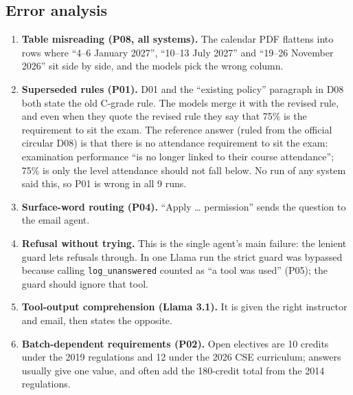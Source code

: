 \documentclass[11pt,a4paper]{article}
\newcommand{\code}[1]{\texttt{#1}}
\begin{document}
\subsection{Error analysis}
\begin{enumerate}
  \item \textbf{Table misreading (P08, all systems).} The calendar PDF flattens into rows where ``4--6 January 2027'',
        ``10--13 July 2027'' and ``19--26 November 2026'' sit side by side, and the models pick the wrong column.
  \item \textbf{Superseded rules (P01).} D01 and the ``existing policy'' paragraph in D08 both state the old C-grade
        rule. The models merge it with the revised rule, and even when they quote the revised rule they say that 75\% is the requirement to sit the exam. The reference answer (ruled from the official circular D08) is that there is no attendance requirement to sit the exam: examination performance ``is no longer linked to their course attendance''; 75\% is only the level attendance should not fall below. No run of any system said this, so P01 is wrong in all 9 runs.
  \item \textbf{Surface-word routing (P04).} ``Apply \ldots{} permission'' sends the question to the email agent.
  \item \textbf{Refusal without trying.} This is the single agent's main failure: the lenient guard lets refusals
        through. In one Llama run the strict guard was bypassed because calling \code{log\_unanswered} counted as
        ``a tool was used'' (P05); the guard should ignore that tool.
  \item \textbf{Tool-output comprehension (Llama 3.1).} It is given the right instructor and email, then states the opposite.
  \item \textbf{Batch-dependent requirements (P02).} Open electives are 10 credits under the 2019 regulations and 12 under
        the 2026 CSE curriculum; answers usually give one value, and often add the 180-credit total from the 2014
        regulations.
\end{enumerate}

\end{document}
